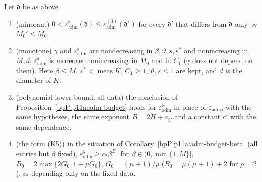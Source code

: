 \begin{proposition}\label{bpP:p11a:budget}
Let $\mathfrak d$ be as above.
\begin{enumerate}[label=(\alph*)]
\item\label{bpP:p11a:bu-minor} (minorant) $0<\varepsilon_{\mathrm{adm}}^\flat(\mathfrak d)\le\varepsilon_{\mathrm{adm}}^{(3)}(\mathfrak d')$ for every $\mathfrak d'$ that differs from $\mathfrak d$ only by $M_0'\le M_0$.
\item\label{bpP:p11a:bu-mono} (monotone) $\gamma$ and $\varepsilon^\flat_{\mathrm{adm}}$ are nondecreasing in $\beta,\vartheta,s,\varepsilon^*$ and nonincreasing in $M,d$; $\varepsilon^\flat_{\mathrm{adm}}$ is moreover nonincreasing in $M_0$ and in $C_1$ ($\gamma$ does not depend on them). Here $\beta\le M$, $\varepsilon^*<\operatorname{meas}K$, $C_1\ge1$, $\vartheta,s\le1$ are kept, and $d$ is the diameter of $K$.
\item\label{bpP:p11a:bu-poly} (polynomial lower bound, all data) the conclusion of Proposition~\ref{bpP:p11a:adm-budget} holds for $\varepsilon^\flat_{\mathrm{adm}}$ in place of $\varepsilon_{\mathrm{adm}}$, with the same hypotheses, the same exponent $B=2H+a_C$ and a constant $c'$ with the same dependence.
\item\label{bpP:p11a:bu-beta} (the form (K5)) in the situation of Corollary~\ref{bpP:p11a:adm-budget-beta} (all entries but $\beta$ fixed), $\varepsilon^\flat_{\mathrm{adm}}\ge c_*\beta^{B_0}$ for $\beta\in(0,\min\{1,M\}]$, $B_0=2\max\{2G_0,1+\mu G_0\}$, $G_0=(\mu+1)/\rho$ ($B_0=\mu(\mu+1)+2$ for $\rho=2$), $c_*$ depending only on the fixed data.
\end{enumerate}
\end{proposition}
